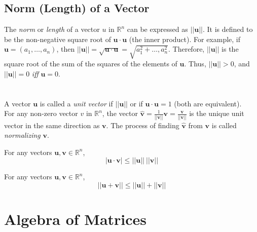 \documentclass[../setup.tex]{subfiles}
\begin{document}
\subsection{Norm (Length) of a Vector}
The \textit{norm} or \textit{length} of a vector $u$ in $\mathbb{R}^n$ can be expressed as $||\bm{u}||$. It is defined to be the non-negative square root of $\bm{u} \cdot \bm{u}$ (the inner product). For example, if $\bm{u} = (a_1, \dots, a_n)$, then $||\bm{u}|| = \sqrt{\bm{u} \cdot \bm{u}} = \sqrt{a_1^2 + \dots, a_n^2}$. Therefore, $||\bm{u}||$ is the square root of the sum of the squares of the elements of $\bm{u}$. Thus, $||\bm{u}|| > 0$, and $||\bm{u}|| = 0$ \textit{iff} $\bm{u} = 0$. \\
\phantom \\ \\
A vector $\bm{u}$ is called a \textit{unit vector} if $||\bm{u}||$ or if $\bm{u} \cdot \bm{u} = 1$ (both are equivalent). \\
For any non-zero vector $v$ in $\mathbb{R}^n$, the vector $\hat{\bm{v}} = \frac{1}{||\bm{v}||}\bm{v} = \frac{\bm{v}}{||\bm{v}||}$ is the unique unit vector in the same direction as $\bm{v}$. The process of finding $\hat{\bm{v}}$ from $\bm{v}$ is called \textit{normalizing} $\bm{v}$. \\
\begin{theorem}
For any vectors $\bm{u}, \bm{v} \in \mathbb{R}^n$, 
\[|\bm{u} \cdot \bm{v}| \leq ||\bm{u}|| \ ||\bm{v}||\]
\end{theorem}
\begin{theorem}
For any vectors $\bm{u}, \bm{v} \in \mathbb{R}^n$,
\[||\bm{u} + \bm{v}|| \leq ||\bm{u}|| + ||\bm{v}||\]
\end{theorem}



\section{Algebra of Matrices}
\end{document}
